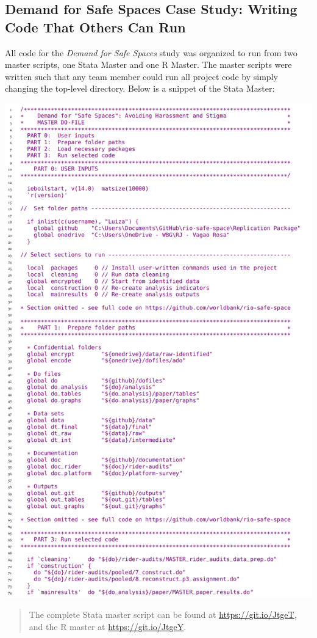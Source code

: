 \documentclass[
]{book}
\begin{document}
\begin{ex}
\hypertarget{demand-for-safe-spaces-case-study-writing-code-that-others-can-run}{%
\subsection*{Demand for Safe Spaces Case Study: Writing Code That Others Can Run}\label{demand-for-safe-spaces-case-study-writing-code-that-others-can-run}}

All code for the \emph{Demand for Safe Spaces} study was organized to run from two master scripts, one Stata Master and one R Master. The master scripts were written such that any team member could run all project code by simply changing the top-level directory. Below is a snippet of the Stata Master:

\includegraphics{examples/ch2-writing-code-that-others-can-run.png}

\begin{quote}
The complete Stata master script can be found at \url{https://git.io/JtgeT}, and the R master at \url{https://git.io/JtgeY}.
\end{quote}
\end{ex}
\end{document}
